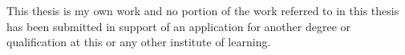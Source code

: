 


\begin{declaration}        %

This thesis is my own work and no portion of the work referred to in this thesis has been submitted in support of an application for another degree or qualification at this or any other institute of learning.

\end{declaration}


